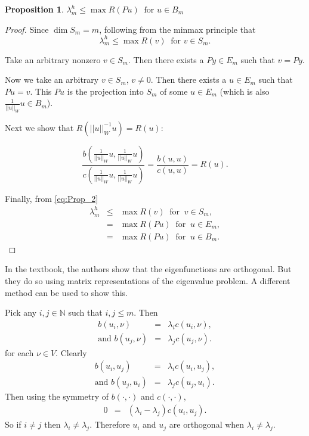 \documentclass[../../main.tex]{subfiles}
\begin{document}
\newtheorem{Prop_2}[Prop_1]{Proposition}
\begin{Prop_2}
	\label{Prop_2}
	$\lambda^{h}_{m} \leq \max R(Pu) \ \text{ for } u \in B_{m}$
\end{Prop_2}
\begin{proof}
	Since $\dim S_{m} = m$, following from the minmax principle that
	\begin{equation}
		\lambda_m^h \leq \max R(v) \ \text{ for } v \in S_m. \label{eq:Prop_2}
	\end{equation}

	Take an arbitrary nonzero $v \in S_m$. Then there exists a $Py \in E_m$ such that $v = Py$.
 
	Now we take an arbitrary $v \in S_{m}$, $v \neq 0$. Then there exists a $u \in E_{m}$ such that $Pu = v$. This $Pu$ is the projection into $S_m$ of some $u \in E_m$ (which is also $\displaystyle \frac{1}{||u||_{W}}u \in B_m$).
	
	Next we show that $R(||u||_{W}^{-1}u) = R(u)$:

	\[ \frac{b\left(\frac{1}{||u||_{W}}u,\frac{1}{||u||_{W}}u\right)}{c\left(\frac{1}{||u||_{W}}u,\frac{1}{||u||_{W}}u\right)} = \frac{b(u,u)}{c(u,u)} = R(u). \]

	Finally, from \eqref{eq:Prop_2}
	\begin{eqnarray*}
	\lambda_{m}^{h} &\leq & \max R(v) \ \text{ for } \ v \in S_{m},\\
						&=& \max R(Pu) \ \text{ for } \ u \in E_{m},\\
						&=& \max R(Pu) \ \text{ for } \ u \in B_{m}.
	\end{eqnarray*}
\end{proof}

In the textbook, the authors show that the eigenfunctions are orthogonal. But they do so using matrix representations of the eigenvalue problem. A different method can be used to show this.

Pick any $i,j \in \mathbb{N}$ such that $i,j \leq m$. Then
\begin{eqnarray*}
	b(u_{i},\nu) &=& \lambda_{i}c(u_{i},\nu),\\
	\textrm{and } b(u_{j},\nu) &=& \lambda_{j}c(u_{j},\nu).
\end{eqnarray*}
for each $\nu \in V$. Clearly
\begin{eqnarray*}
	b(u_{i},u_{j}) &=& \lambda_{i}c(u_{i},u_{j}),\\
	\textrm{and } b(u_{j},u_{i}) &=& \lambda_{j}c(u_{j},u_{i}).
\end{eqnarray*}
Then using the symmetry of $b(\cdot,\cdot)$ and $c( \cdot, \cdot )$,
\begin{eqnarray*}
	0 &=& (\lambda_{i} - \lambda_{j}) c( u_{i}, u_{j} ).
\end{eqnarray*}
So if $i \neq j$ then $\lambda_{i} \neq \lambda_{j}$. Therefore $u_{i}$ and $u_{j}$ are orthogonal when $\lambda_i \neq \lambda_j$.
\end{document}
